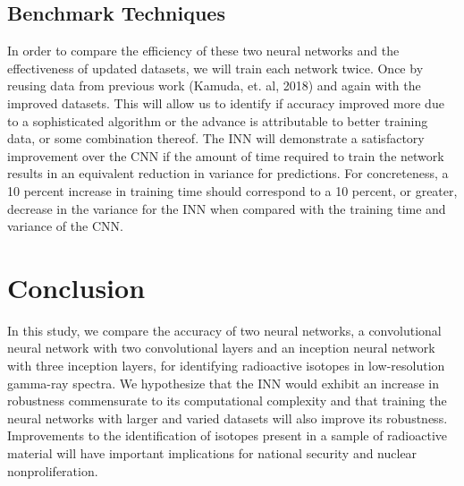 \documentclass{anstrans}
\begin{document}
\subsection{Benchmark Techniques}
In order to compare the efficiency of these two neural networks and the effectiveness of updated datasets, we will train each network twice. 
Once by reusing data from previous work (Kamuda, et. al,  2018) and again with the improved datasets. 
This will allow us to identify if accuracy improved more due to a sophisticated algorithm or the advance is attributable to better training data, or some combination thereof. 
The INN will demonstrate a satisfactory improvement over the CNN if the amount of time required to train the network results in an equivalent reduction in variance for predictions. 
For concreteness, a 10 percent increase in training time should correspond to a 10 percent, or greater, decrease in the variance for the INN when compared with the training time and variance of the CNN.

\section{Conclusion}

In this study, we compare the accuracy of two neural networks, a convolutional neural network with two convolutional layers and an inception neural network with three inception layers, for identifying radioactive isotopes in low-resolution gamma-ray spectra. 
We hypothesize that the INN would exhibit an increase in robustness commensurate to its computational complexity and that training the neural networks with larger and varied datasets will also improve its robustness. 
Improvements to the identification of isotopes present in a sample of radioactive material will have important implications for national security and nuclear nonproliferation.


\end{document}

